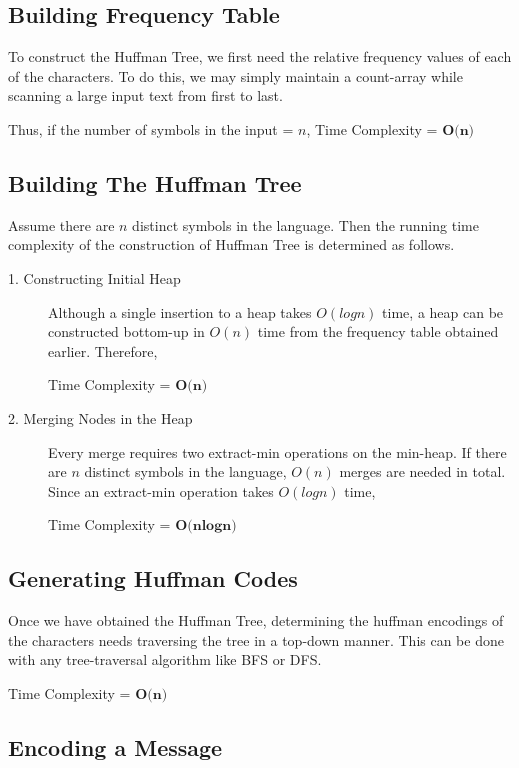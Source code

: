 \documentclass[18pt]{article}
\begin{document}
	\subsection{Building Frequency Table}
	
	To construct the Huffman Tree, we first need the relative frequency values of each of the characters. To do this, we may simply maintain a count-array while scanning a large input text from first to last.
	
	Thus, if the number of symbols in the input = $n$, Time Complexity = $\textbf{O(n)}$
	
	\subsection{Building The Huffman Tree}
	
	Assume there are $n$ distinct symbols in the language. Then the running time complexity of the construction of Huffman Tree is determined as follows.
	
	\begin{description}
		
		\item[1. Constructing Initial Heap] 
		Although a single insertion to a heap takes $O(logn)$ time, a heap can be constructed bottom-up in $O(n)$ time from the frequency table obtained earlier. Therefore,
		
		Time Complexity = $\textbf{O(n)}$
		
		\item[2. Merging Nodes in the Heap] 
		Every merge requires two extract-min operations on the min-heap. If there are $n$ distinct symbols in the language, $O(n)$ merges are needed in total. Since an extract-min operation takes $O(logn)$ time, 
		
		Time Complexity = $\textbf{O(nlogn)}$
		
	\end{description}
	
	\subsection{Generating Huffman Codes}
	Once we have obtained the Huffman Tree, determining the huffman encodings of the characters needs traversing the tree in a top-down manner. This can be done with any tree-traversal algorithm like BFS or DFS.
	
	Time Complexity = $\textbf{O(n)}$
	
	\subsection{Encoding a Message}
	
\end{document}
